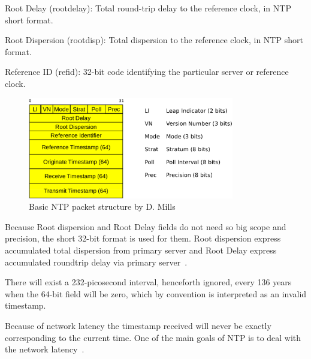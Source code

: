    
   
   Root Delay (rootdelay): Total round-trip delay to the reference
   clock, in NTP short format.

   Root Dispersion (rootdisp): Total dispersion to the reference clock,
   in NTP short format.

Reference ID (refid): 32-bit code identifying the particular server or reference clock.

\begin{figure}
	\centering
	\includegraphics[width=9cm,keepaspectratio]{fig/ntp-packet.pdf}
	\caption{Basic NTP packet structure by D. Mills}
	\label{fig:ntp-packet}
	\bigskip
\end{figure}

Because Root dispersion and Root Delay fields do not need so big scope and precision,
the short 32-bit format is used for them.
Root dispersion express accumulated total dispersion from primary server
and Root Delay express accumulated roundtrip delay via primary server~\cite{ntp-arch}.


There will exist
   a 232-picosecond interval, henceforth ignored, every 136 years when
   the 64-bit field will be zero, which by convention is interpreted as
   an invalid timestamp.

Because of network latency the timestamp received will never be exactly corresponding to
the current time.
One of the main goals of NTP is to deal with the network latency~\cite{ntp-overview}.
